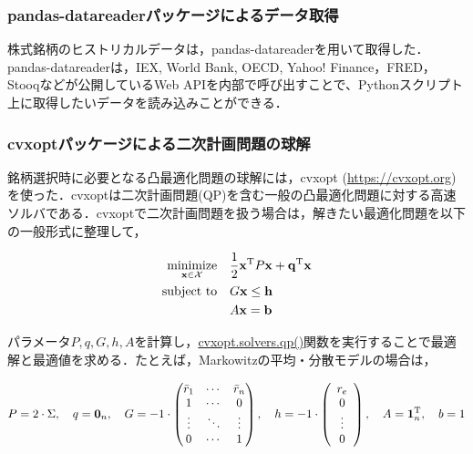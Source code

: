 \documentclass[dvipdfmx,autodetect-engine]{jsarticle}
\begin{document}
\subsubsection{pandas-datareaderパッケージによるデータ取得}

株式銘柄のヒストリカルデータは，pandas-datareaderを用いて取得した．pandas-datareaderは，IEX, World Bank, OECD, Yahoo! Finance，FRED，Stooqなどが公開しているWeb APIを内部で呼び出すことで、Pythonスクリプト上に取得したいデータを読み込みことができる．

\subsubsection{cvxoptパッケージによる二次計画問題の球解}

銘柄選択時に必要となる凸最適化問題の球解には，cvxopt (\url{https://cvxopt.org})を使った．cvxoptは二次計画問題(QP)を含む一般の凸最適化問題に対する高速ソルバである．cvxoptで二次計画問題を扱う場合は，解きたい最適化問題を以下の一般形式に整理して，

\begin{align}
\underset{{\bf x} \in \mathcal{X}}{\rm minimize} ~~~ 
&\frac{1}{2} {\bf x}^{\mathrm{T}} P {\bf x} + {\bf q}^{\mathrm{T}} {\bf x} \\
{\rm subject~to} ~~~ & G {\bf x} \leq {\bf h} \\
&A {\bf x} = {\bf b}
\end{align}

パラメータ$P,q,G,h,A$を計算し，\href{https://cvxopt.org/userguide/coneprog.html#quadratic-programming}{cvxopt.solvers.qp()}関数を実行することで最適解と最適値を求める．たとえば，Markowitzの平均・分散モデルの場合は，

\begin{align}
    P = 2 \cdot \Sigma, \hspace{1em}
    q = {\bf 0}_n, \hspace{1em}
    G = -1 \cdot
        \begin{pmatrix}
            \bar{r}_1 & \cdots & \bar{r}_n \\
            1 & \cdots & 0 \\
            \vdots & \ddots & \vdots \\
            0 & \cdots & 1 
        \end{pmatrix}, \hspace{1em}
    h = -1 \cdot 
        \left(
            \begin{array}{c}
              r_e \\
              0 \\
              \vdots \\
              0
            \end{array}
        \right), \hspace{1em}
    A = {\bf 1}_n^{\mathrm{T}}, \hspace{1em}
    b = 1
\end{align}
\end{document}
